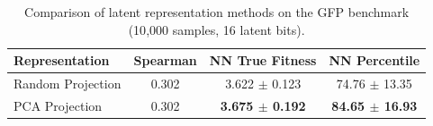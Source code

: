 \begin{table}[t]
\centering
\small
\begin{tabular}{lccc}
\hline
\textbf{Representation} & \textbf{Spearman} & \textbf{NN True Fitness} & \textbf{NN Percentile} \\
\hline
Random Projection & 0.302 & 3.622 $\pm$ 0.123 & 74.76 $\pm$ 13.35 \\
PCA Projection & 0.302 & \textbf{3.675 $\pm$ 0.192} & \textbf{84.65 $\pm$ 16.93} \\
\hline
\end{tabular}
\caption{Comparison of latent representation methods on the GFP benchmark (10{,}000 samples, 16 latent bits).}
\label{tab:representation}
\end{table}